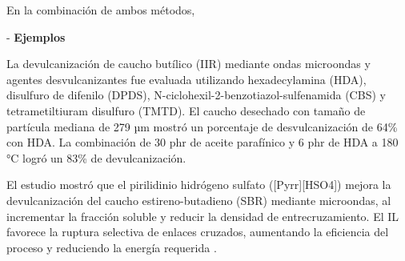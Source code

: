 \begin{multicols}{2}
En la combinación de ambos métodos, 


- \textbf{Ejemplos}


La devulcanización de caucho butílico (IIR) mediante ondas microondas y agentes desvulcanizantes fue evaluada utilizando hexadecylamina (HDA), disulfuro de difenilo (DPDS), N-ciclohexil-2-benzotiazol-sulfenamida (CBS) y tetrametiltiuram disulfuro (TMTD). El caucho desechado con tamaño de partícula mediana de 279 µm mostró un porcentaje de desvulcanización de 64\% con HDA. La combinación de 30 phr de aceite parafínico y 6 phr de HDA a 180 °C logró un 83\% de devulcanización. %

El estudio mostró que el pirilidinio hidrógeno sulfato ([Pyrr][HSO4]) mejora la devulcanización del caucho estireno-butadieno (SBR) mediante microondas, al incrementar la fracción soluble y reducir la densidad de entrecruzamiento. El IL favorece la ruptura selectiva de enlaces cruzados, aumentando la eficiencia del proceso y reduciendo la energía requerida \cite{Gorbe2024}.










\end{multicols}
